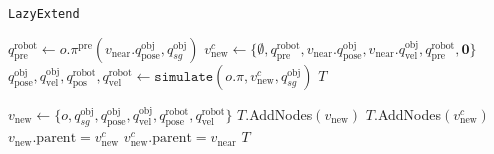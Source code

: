 \begin{algorithm}[H]
\caption{\texttt{LazyExtend}}\label{algo:AbstractExtend}
\begin{algorithmic}[1]

    \State ${q}^{\text{robot}}_{\text{pre}} \gets o.\pi^\text{pre}(v_{\text{near}}.q^{\text{obj}}_\text{pose}, {q}^{\text{obj}}_{sg})$
    \State $v^c_\text{new} \gets \{\emptyset, q^\text{robot}_\text{pre},v_\text{near}.q^\text{obj}_\text{pose},v_\text{near}.q^\text{obj}_\text{vel},q^\text{robot}_\text{pre}, \textbf{0} \}$ %
    \State {}
    \State $q^{\text{obj}}_\text{pose},q^{\text{obj}}_\text{vel}, q^{\text{robot}}_\text{pos}, q^{\text{robot}}_\text{vel} \gets \texttt{simulate}(o.\pi, v^c_\text{new}, {q}^{\text{obj}}_{sg})$
        \State \Return $T$
    \EndIf

    \State ${v_{\text{new}}} \gets \{o, q^\text{obj}_{sg}, {q}^{\text{obj}}_\text{pose},{q}^{\text{obj}}_\text{vel}, {q}^{\text{robot}}_\text{pose},  {q}^{\text{robot}}_\text{vel}\}$
    \State $T$.AddNodes$({v}_{\text{new}})$
    \State $T$.AddNodes$({v}^c_{\text{new}})$
    \State $v_{\text{new}}.\text{parent} = v^c_{\text{new}}$
    \State $v^c_{\text{new}}.\text{parent} = v_{\text{near}}$
    \State \Return $T$
\EndProcedure

\end{algorithmic}
\end{algorithm}
